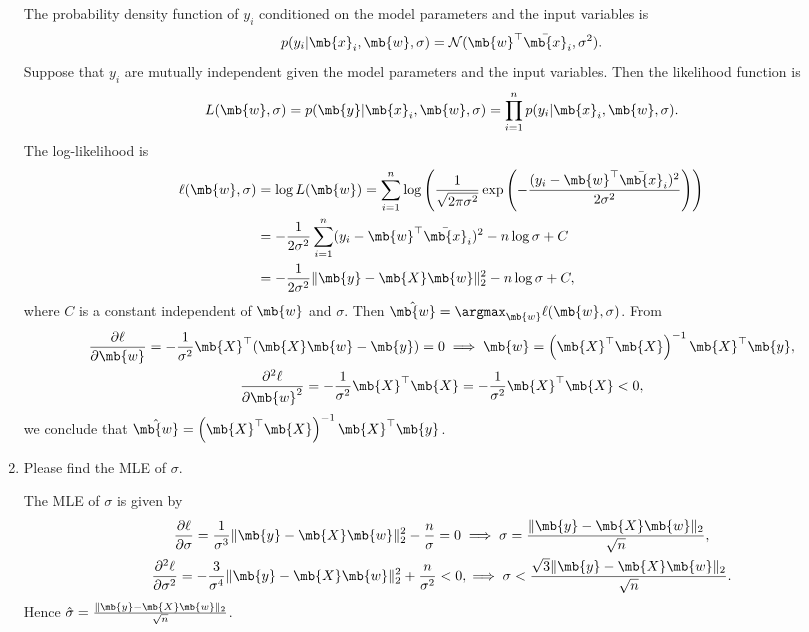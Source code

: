 \begin{exercise}
\begin{enumerate}
            \begin{solution}
                The probability density function of $y_i$ conditioned on the model parameters and the input variables is
                $$ p(y_i|\mb{x}_i,\mb{w},\sigma) = \mathcal{N}(\mb{w}^\top\bar{\mb{x}}_i,\sigma^2).$$
                Suppose that ${y_i}$ are mutually independent given the model parameters and the input variables. Then the likelihood function is
                $$L(\mb{w},\sigma) = p(\mb{y}|\mb{x}_i,\mb{w},\sigma) = \prod_{i=1}^n p(y_i|\mb{x}_i,\mb{w},\sigma).$$
                The log-likelihood is
                \begin{align*}
                    \ell(\mb{w},\sigma) & = \log L(\mb{w}) = \sum_{i=1}^n \log \left( \frac{1}{\sqrt{2\pi\sigma^2}} \exp\left(-\frac{(y_i-\mb{w}^\top\bar{\mb{x}}_i)^2}{2\sigma^2}\right)\right) \\ & = -\frac{1}{2\sigma^2}\sum_{i=1}^n (y_i-\mb{w}^\top\bar{\mb{x}}_i)^2 - n\log\sigma+ C \\ & = -\frac{1}{2\sigma^2} \|\mb{y} - \mb{X}\mb{w}\|^2_2 - n\log\sigma + C,
                \end{align*}
                where $C$ is a constant independent of $\mb{w}$ and $\sigma$. Then $\hat{\mb{w}} = \argmax_{\mb{w}} \ell(\mb{w},\sigma)$. From
                \begin{gather*}    
                    \frac{\partial \ell}{\partial \mb{w}} = -\frac{1}{\sigma^2} \mb{X}^\top(\mb{X}\mb{w}-\mb{y}) = 0 \implies \mb{w} = \left(\mb{X}^\top\mb{X}\right)^{-1}\mb{X}^\top\mb{y},\\
                    \frac{\partial^2 \ell}{\partial \mb{w}^2} = -\frac{1}{\sigma^2} \mb{X}^\top\mb{X} = -\frac{1}{\sigma^2} \mb{X}^\top\mb{X} < 0,
                \end{gather*}
                we conclude that $\hat{\mb{w}} = \left(\mb{X}^\top\mb{X}\right)^{-1}\mb{X}^\top\mb{y}$.
                \qedhere
            \end{solution}
            \pagebreak
        \item Please find the MLE of $\sigma$.
            \begin{solution}
                The MLE of $\sigma$ is given by
                \begin{gather*}    
                    \frac{\partial \ell}{\partial \sigma} = \frac{1}{\sigma^3} \|\mb{y} - \mb{X}\mb{w}\|^2_2  - \frac{n}{\sigma}=0 \implies \sigma = \frac{\|\mb{y} - \mb{X}\mb{w}\|_2}{\sqrt{n}}, \\
                    \frac{\partial^2 \ell}{\partial \sigma^2} = -\frac{3}{\sigma^4} \|\mb{y} - \mb{X}\mb{w}\|^2_2 + \frac{n}{\sigma^2} < 0, \implies \sigma < \frac{\sqrt{3}\|\mb{y} - \mb{X}\mb{w}\|_2}{\sqrt{n}}.
                \end{gather*}
                Hence $\hat{\sigma} = \frac{\|\mb{y} - \mb{X}\mb{w}\|_2}{\sqrt{n}}$.
                \qedhere
            \end{solution}
    \end{enumerate}
\end{exercise}




